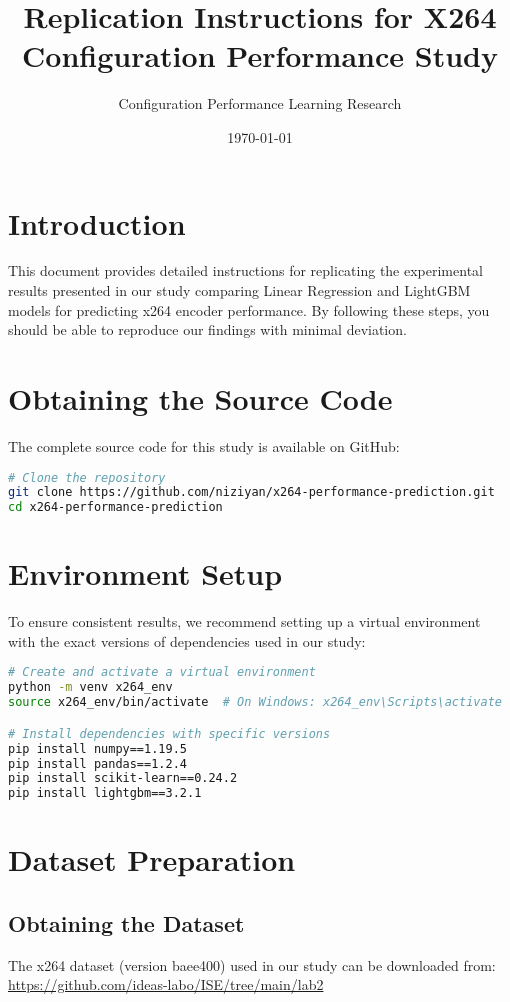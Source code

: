 \documentclass[10pt]{article}
\title{Replication Instructions for X264 Configuration Performance Study}
\author{Configuration Performance Learning Research}
\date{\today}
\begin{document}
\maketitle

\section{Introduction}

This document provides detailed instructions for replicating the experimental results presented in our study comparing Linear Regression and LightGBM models for predicting x264 encoder performance. By following these steps, you should be able to reproduce our findings with minimal deviation.

\section{Obtaining the Source Code}

The complete source code for this study is available on GitHub:

\begin{lstlisting}[language=bash]
# Clone the repository
git clone https://github.com/niziyan/x264-performance-prediction.git
cd x264-performance-prediction
\end{lstlisting}

\section{Environment Setup}

To ensure consistent results, we recommend setting up a virtual environment with the exact versions of dependencies used in our study:

\begin{lstlisting}[language=bash]
# Create and activate a virtual environment
python -m venv x264_env
source x264_env/bin/activate  # On Windows: x264_env\Scripts\activate

# Install dependencies with specific versions
pip install numpy==1.19.5
pip install pandas==1.2.4
pip install scikit-learn==0.24.2
pip install lightgbm==3.2.1
\end{lstlisting}

\section{Dataset Preparation}

\subsection{Obtaining the Dataset}
The x264 dataset (version baee400) used in our study can be downloaded from:
\url{https://github.com/ideas-labo/ISE/tree/main/lab2}
\end{document}
